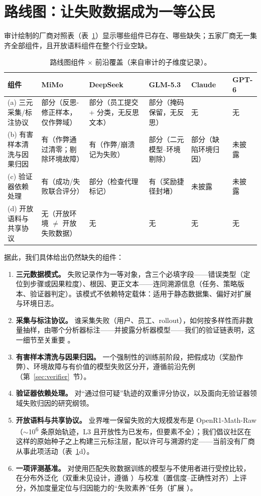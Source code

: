 \documentclass[10pt,fontset=fandol]{ctexart}
\begin{document}
\section{路线图：让失败数据成为一等公民}\label{sec:roadmap}

审计绘制的厂商对照表（表~\ref{tab:roadmap}）显示哪些组件已存在、哪些缺失；五家厂商无一集齐全部组件，且开放语料组件在整个行业空缺。

\begin{table}[t]
\centering
\caption{路线图组件 $\times$ 前沿覆盖（来自审计的子维度记录）。}
\label{tab:roadmap}
\footnotesize
\setlength{\tabcolsep}{3.5pt}
\begin{tabular}{p{2.9cm}p{2.4cm}p{2.6cm}p{2.4cm}p{1.9cm}p{1.7cm}}
\toprule
组件 & MiMo & DeepSeek & GLM-5.3 & Claude & GPT-6 \\
\midrule
(a) 三元采集/标注协议 & 部分（反思-修正样本，仅作弊域） & 部分（员工提交 + 分类，无反思文本） & 部分（掩码保留，无反思） & 无 & 无 \\
(b) 有害样本清洗与因果归因 & 有（作弊通过清零；剔除环境故障） & 有（作弊/崩溃记为失败） & 部分（二元模型--环境剔除） & 部分（缺陷环境归因） & 未披露 \\
(c) 验证器依赖处理 & 有（成功/失败联合评分） & 部分（检查代理标记） & 有（奖励捷径封堵） & 未披露 & 未披露 \\
(d) 开放语料与共享协议 & 无（开放环境 $\neq$ 开放失败数据） & 无 & 无 & 无 & 无 \\
\bottomrule
\end{tabular}
\end{table}

据此，我们具体给出仍然缺失的组件：

\begin{enumerate}
\item \textbf{三元数据模式。} 失败记录作为一等对象，含三个必填字段——错误类型（定位到步骤或因果粒度）、根因、更正文本——连同溯源信息（任务、策略版本、验证器判定）。该模式不依赖特定载体：适用于静态数据集、偏好对扩展与环境日志。
\item \textbf{采集与标注协议。} 谁采集失败（用户、员工、rollout），如何按多样性而非数量抽样，由哪个分析器标注——并披露分析器模型——我们的验证链表明，这一细节至关重要 \cite{hao2026prs}。
\item \textbf{有害样本清洗与因果归因。} 一个强制性的训练前阶段，把假成功（奖励作弊）、环境故障与有价值的模型失败区分开，遵循前沿先例（第~\ref{sec:verifier}~节）。
\item \textbf{验证器依赖处理。} 对“通过但可疑”轨迹的双重评分协议，以及面向无验证器领域失败归因的研究纲领。
\item \textbf{开放语料与共享协议。} 业界唯一保留失败的大规模发布是 OpenR1-Math-Raw（$\sim$10\textsuperscript{6} 条原始轨迹，L3 且开放性为已发布，但要素不全）\cite{openr12025mathraw}；我们倡议社区在这样的原始种子之上构建三元标注层，配以许可与溯源约定——当前没有厂商从事此项活动（表~\ref{tab:roadmap}d）。
\item \textbf{一项评测基准。} 对使用匹配失败数据训练的模型与不使用者进行受控比较，在分布外泛化（双重未见设计，遵循 \cite{hao2026prs}）与校准（置信度--正确性对齐）上评分，外加度量定位与归因能力的“失败素养”任务（扩展 \cite{zheng2024processbench,song2025prmbench}）。
\end{enumerate}
\end{document}
